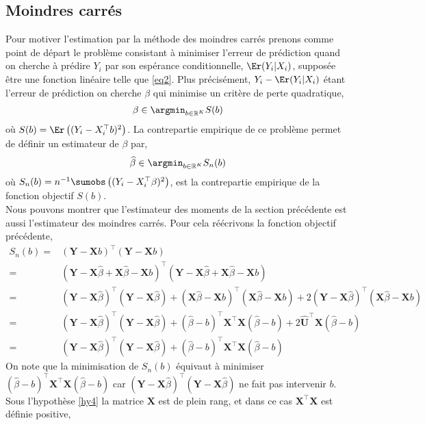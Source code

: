 \subsection{Moindres carrés}
Pour motiver l'estimation par la méthode des moindres carrés prenons comme point de départ le problème consistant à minimiser l'erreur de prédiction quand on cherche à prédire $Y_i$ par son espérance conditionnelle, $\Er(Y_i|X_i)$, supposée être une fonction linéaire telle que \eqref{eq2}. Plus précisément, $Y_i - \Er(Y_i|X_i)$ étant l'erreur de prédiction  on cherche $\beta$ qui minimise un critère de perte quadratique,
\begin{align*}
\beta \in \argmin_{b\in \mathbb{R}^K}S(b)
\end{align*}
où $S(b) =\Er\left((Y_i - X_i^\top b)^2\right)$.
La contrepartie empirique de ce problème permet de définir un estimateur de $\beta$ par,
\begin{align*}
\widehat{\beta} \in \argmin_{b\in \mathbb{R}^K}S_n(b)
\end{align*}
où $S_n(b)=n^{-1}\sumobs\left((Y_i - X_i^\top\beta)^2\right)$, est la contrepartie empirique de la fonction objectif $S(b)$.\\
Nous pouvons montrer que l'estimateur des moments de la section précédente est aussi l'estimateur des moindres carrés. Pour cela réécrivons la fonction objectif précédente,
\begin{align*}
S_n(b) = & (\mathbf{Y} - \mathbf{X}b)^\top (\mathbf{Y} - \mathbf{X}b)\\
=&(\mathbf{Y} - \mathbf{X}\widehat{\beta}+ \mathbf{X}\widehat{\beta}  - \mathbf{X}b)^\top (\mathbf{Y} - \mathbf{X}\widehat{\beta}+ \mathbf{X}\widehat{\beta} - \mathbf{X}b)\\
=&(\mathbf{Y} - \mathbf{X}\widehat{\beta})^\top(\mathbf{Y} - \mathbf{X}\widehat{\beta}) +(\mathbf{X}\widehat{\beta} - \mathbf{X}b)^\top (\mathbf{X}\widehat{\beta} - \mathbf{X}b)+ 2(\mathbf{Y}-\mathbf{X}\widehat{\beta})^\top(\mathbf{X}\widehat{\beta}-\mathbf{X}b)\\
=&(\mathbf{Y} - \mathbf{X}\widehat{\beta})^\top(\mathbf{Y} - \mathbf{X}\widehat{\beta}) + (\widehat{\beta}-b)^\top \mathbf{X}^\top\mathbf{X} (\widehat{\beta}-b) 
+ 2\widehat{\mathbf{U}}^\top \mathbf{X}(\widehat{\beta}-b)\\
=&(\mathbf{Y} - \mathbf{X}\widehat{\beta})^\top(\mathbf{Y} - \mathbf{X}\widehat{\beta}) + (\widehat{\beta}-b)^\top \mathbf{X}^\top\mathbf{X} (\widehat{\beta}-b) 
\end{align*}
On note que la minimisation de $S_n(b)$ équivaut à minimiser $(\widehat{\beta}-b)^\top \mathbf{X}^\top\mathbf{X} (\widehat{\beta}-b)$ car $(\mathbf{Y} - \mathbf{X}\widehat{\beta})^\top(\mathbf{Y} - \mathbf{X}\widehat{\beta})$ ne fait pas intervenir $b$.  Sous l'hypothèse \ref{hy4} la matrice $\mathbf{X}$ est de plein rang, et dans ce cas $\mathbf{X}^\top\mathbf{X}$ est définie positive,
